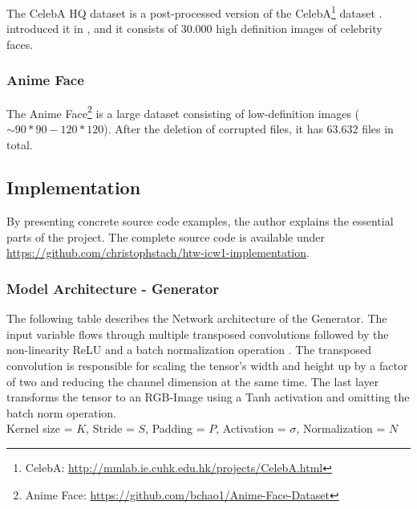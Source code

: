 The CelebA HQ dataset is a post-processed version of the CelebA\footnote{CelebA: \url{http://mmlab.ie.cuhk.edu.hk/projects/CelebA.html}} dataset \cite{liu2015faceattributes}. \citeauthor{karras2018progressive} introduced it in  \cite{karras2018progressive}, and it consists of 30.000 high definition images of celebrity faces.


\subsubsection{Anime Face}

The Anime Face\footnote{Anime Face: \url{https://github.com/bchao1/Anime-Face-Dataset}} is a large dataset consisting of low-definition images ($ \sim 90*90 - 120*120 $). After the deletion of corrupted files, it has 63.632 files in total.


\subsection{Implementation}

By presenting concrete source code examples, the author explains the essential parts of the project. The complete source code is available under \url{https://github.com/christophstach/htw-icw1-implementation}.

\subsubsection{Model Architecture - Generator}

The following table describes the Network architecture of the Generator. The input variable flows through multiple transposed convolutions followed by the non-linearity ReLU and a batch normalization operation \cite{ioffe2015batchnorm}. The transposed convolution is responsible for scaling the tensor's width and height up by a factor of two and reducing the channel dimension at the same time. The last layer transforms the tensor to an RGB-Image using a Tanh activation and omitting the batch norm operation. \\


Kernel size = $ K $,
Stride = $ S $,
Padding = $ P $,
Activation = $ \sigma $,
Normalization = $ N $ \\

